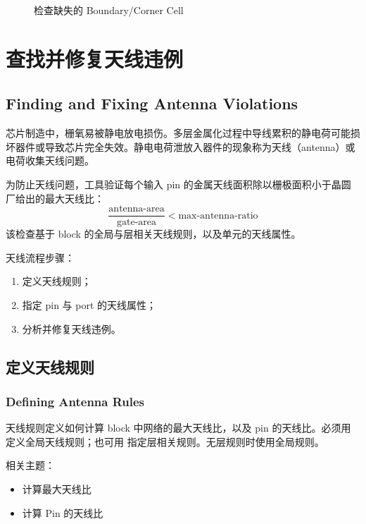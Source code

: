 \begin{figure}[htbp]
\centering
{}
\caption{检查缺失的 Boundary/Corner Cell}
\label{fig:check-missing-boundary}
\end{figure}

\section{查找并修复天线违例}
\subsection*{Finding and Fixing Antenna Violations}

芯片制造中，栅氧易被静电放电损伤。多层金属化过程中导线累积的静电荷可能损坏器件或导致芯片完全失效。静电电荷泄放入器件的现象称为天线（antenna）或电荷收集天线问题。

为防止天线问题，工具验证每个输入 pin 的金属天线面积除以栅极面积小于晶圆厂给出的最大天线比：
\[
\frac{\text{antenna-area}}{\text{gate-area}} < \text{max-antenna-ratio}
\]
该检查基于 block 的全局与层相关天线规则，以及单元的天线属性。

天线流程步骤：
\begin{enumerate}
  \item 定义天线规则；
  \item 指定 pin 与 port 的天线属性；
  \item 分析并修复天线违例。
\end{enumerate}

\subsection{定义天线规则}
\subsubsection*{Defining Antenna Rules}

天线规则定义如何计算 block 中网络的最大天线比，以及 pin 的天线比。必须用  定义全局天线规则；也可用  指定层相关规则。无层规则时使用全局规则。

相关主题：
\begin{itemize}
  \item 计算最大天线比
  \item 计算 Pin 的天线比
\end{itemize}

